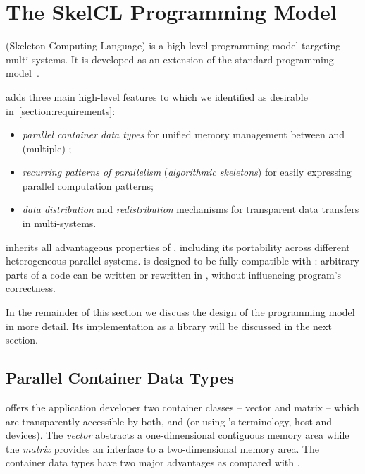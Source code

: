 \section{The SkelCL Programming Model}
\label{section:skelcl-programming-model}
\SkelCL (Skeleton Computing Language) is a high-level programming model targeting multi-\GPU systems.
It is developed as an extension of the standard \OpenCL programming model~\cite{OpenCL}.

\SkelCL adds three main high-level features to \OpenCL which we identified as desirable in~\autoref{section:requirements}:

\begin{itemize}
  \item \emph{parallel container data types} for unified memory management between \CPU and (multiple) \GPUs;
  \item \emph{recurring patterns of parallelism} (\aka \emph{algorithmic skeletons}) for easily expressing parallel computation patterns;
  \item \emph{data distribution} and \emph{redistribution} mechanisms for transparent data transfers in multi-\GPU systems.
\end{itemize}

\noindent
\SkelCL inherits all advantageous properties of \OpenCL, including its portability across different heterogeneous parallel systems.
\SkelCL is designed to be fully compatible with \OpenCL: arbitrary parts of a \SkelCL code can be written or rewritten in \OpenCL, without influencing program's correctness.

In the remainder of this section we discuss the design of the \SkelCL programming model in more detail.
Its implementation as a \Cpp library will be discussed in the next section.

\subsection{Parallel Container Data Types}
\label{section:skelcl-programming-model:container}
\SkelCL offers the application developer two container classes -- vector and matrix -- which are transparently accessible by both, \CPU and \GPUs (or using \OpenCL's terminology, host and devices).
The \emph{vector} abstracts a one-dimensional contiguous memory area while the \emph{matrix} provides an interface to a two-dimensional memory area.
The \SkelCL container data types have two major advantages as compared with \OpenCL.

